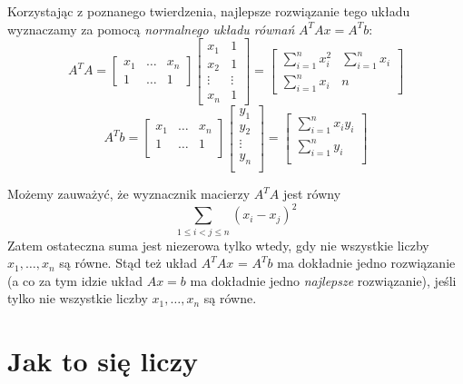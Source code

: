 \documentclass[a4paper,12pt]{article}
\begin{document}
\newpage

Korzystając z poznanego twierdzenia, najlepsze rozwiązanie tego układu wyznaczamy za pomocą \emph{normalnego układu równań} \(A^T A x = A^T b\):
\[
	A^T A = \begin{bmatrix}
		x_1 & \dots & x_n \\
		1 & \dots & 1
	\end{bmatrix}
	\begin{bmatrix}
		x_1 & 1 \\
		x_2 & 1 \\
		\vdots & \vdots \\
		x_n & 1
	\end{bmatrix}
	=
	\begin{bmatrix}
		\sum_{i=1}^{n} x_i^2 &  \sum_{i=1}^{n} x_i \\
		\sum_{i=1}^{n} x_i & n
	\end{bmatrix}
\] 
\[
	A^T b = 
	\begin{bmatrix}
		x_1 & \dots & x_n \\
		1 & \dots & 1  \\
	\end{bmatrix}
	\begin{bmatrix}
		 y_1 \\
		 y_2 \\
		 \vdots \\
		 y_n \\
	\end{bmatrix}
	=
	\begin{bmatrix}
		 \sum_{i=1}^{n} x_i y_i \\
		 \sum_{i=1}^{n} y_i  \\
	\end{bmatrix}
\]

Możemy zauważyć, że wyznacznik macierzy \(A^T A\) jest równy
\[
	\sum_{1 \leq i < j \leq n} (x_{i} - x_{j})^2 
\]
Zatem ostateczna suma jest niezerowa tylko wtedy, gdy nie wszystkie liczby \(x_1, \dots , x_n\) są równe. Stąd też układ \(A^T Ax\) = \(A^T b\) ma dokładnie jedno rozwiązanie (a co za tym idzie układ \(Ax = b\) ma dokładnie jedno \emph{najlepsze} rozwiązanie), jeśli tylko nie wszystkie liczby \(x_1, \dots , x_n\) są równe.

\section{Jak to się liczy}
\end{document}
